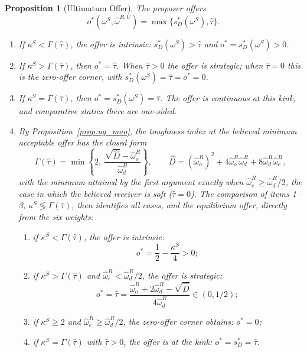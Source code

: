\documentclass[11pt]{article}
\theoremstyle{plain}
\newtheorem{proposition}{Proposition}
\theoremstyle{remark}
\begin{document}
\begin{proposition}[Ultimatum Offer]
\label{prop:ug_offer}
The proposer offers
\begin{equation}
\label{eq:U_offer_point}
        o^\ast(\omega^S,\hat\omega^{R,U})
        =
        \max\{s_D^\ast(\omega^S),\hat\tau\}.
\end{equation}
\begin{enumerate}[topsep=2pt,itemsep=2pt]
\item If $\kappa^S<\Gamma(\hat\tau)$, the offer is \emph{intrinsic}: $s_D^\ast(\omega^S)>\hat\tau$ and $o^\ast=s_D^\ast(\omega^S)>0$.
\item If $\kappa^S>\Gamma(\hat\tau)$, then $o^\ast=\hat\tau$.  When $\hat\tau>0$ the offer is \emph{strategic}; when $\hat\tau=0$ this is the zero-offer corner, with $s_D^\ast(\omega^S)=\hat\tau=o^\ast=0$.
\item If $\kappa^S=\Gamma(\hat\tau)$, then $o^\ast=s_D^\ast(\omega^S)=\hat\tau$.  The offer is continuous at this kink, and comparative statics there are one-sided.
\item By Proposition~\ref{prop:ug_mao}, the toughness index at the believed minimum acceptable offer has the closed form
\[
        \Gamma(\hat\tau)
        =
        \min\left\{2,\ \frac{\sqrt{\hat D}-\hat\omega_o^{R}}{\hat\omega_d^{R}}\right\},
        \qquad
        \hat D=(\hat\omega_o^{R})^2+4\hat\omega_o^{R}\hat\omega_d^{R}+8\hat\omega_d^{R}\hat\omega_e^{R},
\]
with the minimum attained by the first argument exactly when $\hat\omega_e^{R}\ge\hat\omega_d^{R}/2$, the case in which the believed receiver is soft ($\hat\tau=0$).  The comparison of items 1--3, $\kappa^S\lessgtr\Gamma(\hat\tau)$, then identifies all cases, and the equilibrium offer, directly from the six weights:
\begin{enumerate}[topsep=2pt,itemsep=2pt]
\item if $\kappa^S<\Gamma(\hat\tau)$, the offer is intrinsic:
\[
        o^\ast=\frac12-\frac{\kappa^S}{4}>0;
\]
\item if $\kappa^S>\Gamma(\hat\tau)$ and $\hat\omega_e^{R}<\hat\omega_d^{R}/2$, the offer is strategic:
\[
        o^\ast=\hat\tau=\frac{\hat\omega_o^{R}+2\hat\omega_d^{R}-\sqrt{\hat D}}{4\hat\omega_d^{R}}\in(0,1/2);
\]
\item if $\kappa^S\ge2$ and $\hat\omega_e^{R}\ge\hat\omega_d^{R}/2$, the zero-offer corner obtains: $o^\ast=0$;
\item if $\kappa^S=\Gamma(\hat\tau)$ with $\hat\tau>0$, the offer is at the kink: $o^\ast=s_D^\ast=\hat\tau$.
\end{enumerate}
\end{enumerate}
\end{proposition}
\end{document}
